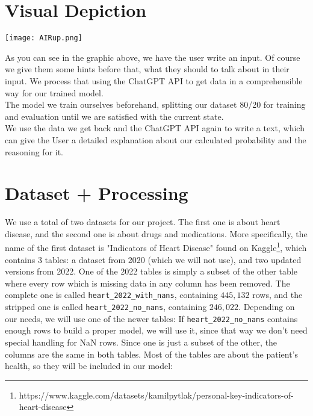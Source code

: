 \documentclass{article}
\begin{document}
\section{Visual Depiction}
\begin{center} 
\texttt{[image: AIRup.png]}
\end{center}
As you can see in the graphic above, we have the user write an input. Of course we give them some hints before that, what they should to talk about in their input. We process that using the ChatGPT API to get data in a comprehensible way for our trained model.
\\
The model we train ourselves beforehand, splitting our dataset 80/20 for training and evaluation until we are satisfied with the current state.
\\
We use the data we get back and the ChatGPT API again to write a text, which can give the User a detailed explanation about our calculated probability and the reasoning for it.

\newpage

\section{Dataset + Processing}

We use a total of two datasets for our project. The first one is about heart disease, and the second one is about drugs and medications.
More specifically, the name of the first dataset is "Indicators of Heart Disease" found on Kaggle\footnote{https://www.kaggle.com/datasets/kamilpytlak/personal-key-indicators-of-heart-disease},
which contains 3 tables: a dataset from 2020 (which we will not use),
and two updated versions from 2022.
One of the 2022 tables is simply a subset of the other table where every row which is missing data in any column has been removed.
The complete one is called \texttt{heart\_2022\_with\_nans}, containing $445,132$ rows,
and the stripped one is called \texttt{heart\_2022\_no\_nans}, containing $246,022$.
Depending on our needs, we will use one of the newer tables:
If \texttt{heart\_2022\_no\_nans} contains enough rows to build a proper model,
we will use it, since that way we don't need special handling for NaN rows.
Since one is just a subset of the other, the columns are the same in both tables.
Most of the tables are about the patient's health, so they will be included in our model:
\end{document}
